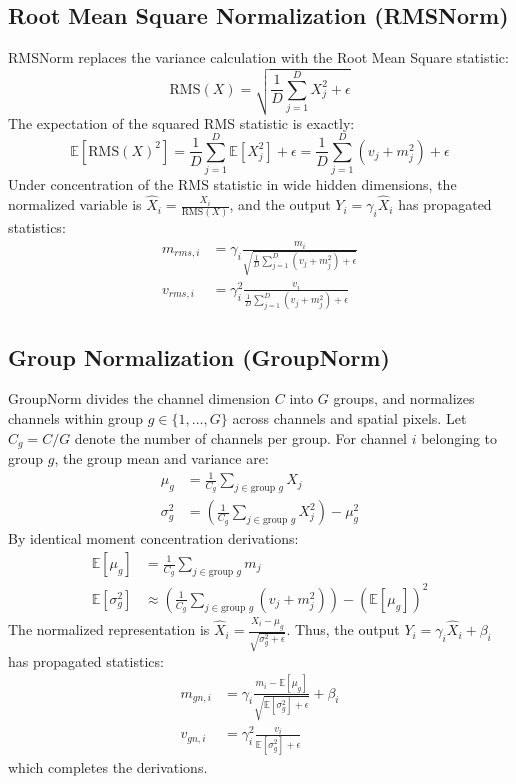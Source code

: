 \documentclass{article}
\theoremstyle{plain}
\theoremstyle{definition}
\theoremstyle{remark}
\begin{document}
\subsection{Root Mean Square Normalization (RMSNorm)}
RMSNorm replaces the variance calculation with the Root Mean Square statistic:
\begin{equation}
    \text{RMS}(X) = \sqrt{\frac{1}{D} \sum_{j=1}^D X_j^2 + \epsilon}
\end{equation}
The expectation of the squared RMS statistic is exactly:
\begin{equation}
    \mathbb{E}[\text{RMS}(X)^2] = \frac{1}{D} \sum_{j=1}^D \mathbb{E}[X_j^2] + \epsilon = \frac{1}{D} \sum_{j=1}^D (v_j + m_j^2) + \epsilon
\end{equation}
Under concentration of the RMS statistic in wide hidden dimensions, the normalized variable is $\hat{X}_i = \frac{X_i}{\text{RMS}(X)}$, and the output $Y_i = \gamma_i \hat{X}_i$ has propagated statistics:
\begin{align}
    m_{rms, i} &= \gamma_i \frac{m_i}{\sqrt{\frac{1}{D}\sum_{j=1}^D (v_j + m_j^2) + \epsilon}} \\
    v_{rms, i} &= \gamma_i^2 \frac{v_i}{\frac{1}{D}\sum_{j=1}^D (v_j + m_j^2) + \epsilon}
\end{align}

\subsection{Group Normalization (GroupNorm)}
GroupNorm divides the channel dimension $C$ into $G$ groups, and normalizes channels within group $g \in \{1, \dots, G\}$ across channels and spatial pixels. Let $C_g = C/G$ denote the number of channels per group. For channel $i$ belonging to group $g$, the group mean and variance are:
\begin{align}
    \mu_g &= \frac{1}{C_g} \sum_{j \in \text{group } g} X_j \\
    \sigma_g^2 &= \left( \frac{1}{C_g} \sum_{j \in \text{group } g} X_j^2 \right) - \mu_g^2
\end{align}
By identical moment concentration derivations:
\begin{align}
    \mathbb{E}[\mu_g] &= \frac{1}{C_g} \sum_{j \in \text{group } g} m_j \\
    \mathbb{E}[\sigma_g^2] &\approx \left( \frac{1}{C_g} \sum_{j \in \text{group } g} (v_j + m_j^2) \right) - (\mathbb{E}[\mu_g])^2
\end{align}
The normalized representation is $\hat{X}_i = \frac{X_i - \mu_g}{\sqrt{\sigma_g^2 + \epsilon}}$. Thus, the output $Y_i = \gamma_i \hat{X}_i + \beta_i$ has propagated statistics:
\begin{align}
    m_{gn, i} &= \gamma_i \frac{m_i - \mathbb{E}[\mu_g]}{\sqrt{\mathbb{E}[\sigma_g^2] + \epsilon}} + \beta_i \\
    v_{gn, i} &= \gamma_i^2 \frac{v_i}{\mathbb{E}[\sigma_g^2] + \epsilon}
\end{align}
which completes the derivations.
\end{document}
